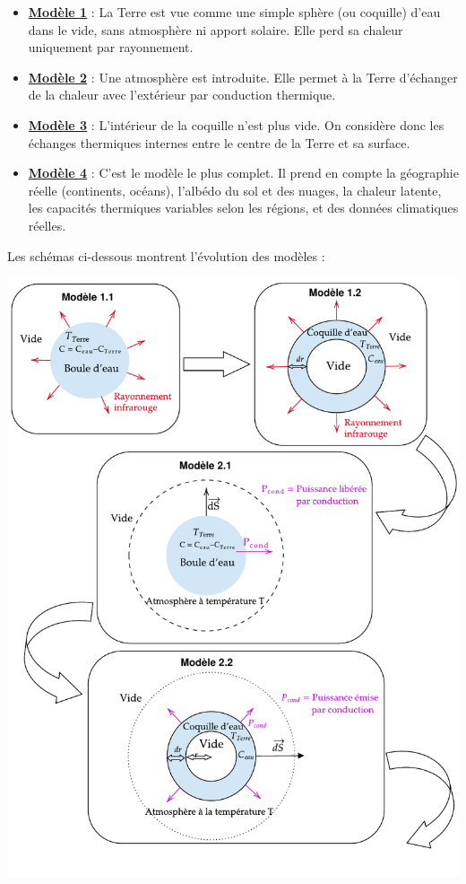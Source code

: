 \documentclass[a4paper,12pt]{article}
\begin{document}
\begin{itemize}
    \item \hyperref[sec:modèle 1]{\textbf{Modèle 1}} : La Terre est vue comme une simple sphère (ou coquille) d’eau dans le vide, sans atmosphère ni apport solaire. Elle perd sa chaleur uniquement par rayonnement.
    
    \item \hyperref[sec:modèle 2]{\textbf{Modèle 2}} : Une atmosphère est introduite. Elle permet à la Terre d’échanger de la chaleur avec l’extérieur par conduction thermique.
    
    \item \hyperref[sec:modèle 3]{\textbf{Modèle 3}} : L’intérieur de la coquille n’est plus vide. On considère donc  les échanges thermiques internes entre le centre de la Terre et sa surface.
    
    \item \hyperref[sec:modèle 4]{\textbf{Modèle 4}} : C’est le modèle le plus complet. Il prend en compte la géographie réelle (continents, océans), l’albédo du sol et des nuages, la chaleur latente, les capacités thermiques variables selon les régions, et des données climatiques réelles.
\end{itemize}

Les schémas ci-dessous montrent l’évolution des modèles :



   \includegraphics[width=1\textwidth, angle=0]{evolution_projet_1.pdf}
\end{document}
